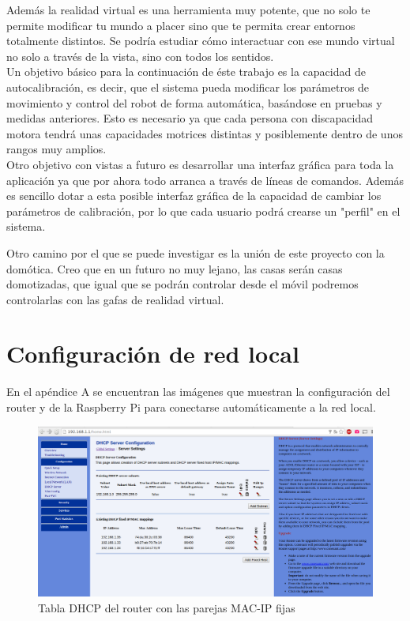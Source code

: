 \documentclass[twoside, 11pt]{epstfg}
\begin{document}
Además la realidad virtual es una herramienta muy potente, que no solo te permite modificar tu mundo a placer sino que te permita crear entornos totalmente distintos. Se podría estudiar cómo interactuar con ese mundo virtual no solo a través de la vista, sino con todos los sentidos.\\Un objetivo básico para la continuación de éste trabajo es la capacidad de autocalibración, es decir, que el sistema pueda modificar los parámetros de movimiento y control del robot de forma automática, basándose en pruebas y medidas anteriores. Esto es necesario ya que cada persona con discapacidad motora tendrá unas capacidades motrices distintas y posiblemente dentro de unos rangos muy amplios.\\Otro objetivo con vistas a futuro es desarrollar una interfaz gráfica para toda la aplicación ya que por ahora todo arranca a través de líneas de comandos. Además es sencillo dotar a esta posible interfaz gráfica de la capacidad de cambiar los parámetros de calibración, por lo que cada usuario podrá crearse un "perfil" en el sistema.

Otro camino por el que se puede investigar es la unión de este proyecto con la domótica.
Creo que en un futuro no muy lejano, las casas serán casas domotizadas, que igual que se podrán controlar desde el móvil podremos controlarlas con las gafas de realidad virtual.


\nocite{*}
{}

\appendix
\chapter{Configuración de red local}
\vspace*{-4cm}
En el apéndice A se encuentran las imágenes que muestran la configuración del router y de la Raspberry Pi para conectarse automáticamente a la red local.
\begin{figure}[H]
	\centerline{
		\mbox{\includegraphics[width=.95\textwidth]{images/TablaDHCP2.png}}
	}
	\caption{Tabla DHCP del router con las parejas MAC-IP fijas}
	\label{Tabla DHPC}
\end{figure}
\end{document}
